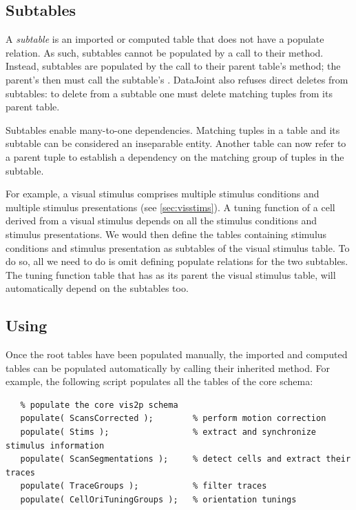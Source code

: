 \documentclass[10pt]{article}
\begin{document}
\subsection{Subtables}\label{sec:subtables}
A {\em subtable} is an imported or computed table that does not have a populate relation. As such, subtables cannot be populated by a call to their  method. Instead, subtables are populated by the call to their parent table's  method; the parent's  then must call the subtable's . DataJoint also refuses direct deletes from subtables: to delete from a subtable one must delete matching tuples from its parent table.

Subtables enable many-to-one dependencies. Matching tuples in a table and its subtable can be considered an inseparable entity. Another table can now refer to a parent tuple to establish a dependency on the matching group of tuples in the subtable.

For example, a visual stimulus comprises multiple stimulus conditions and multiple stimulus presentations (see \autoref{sec:visstims}). A tuning function of a cell derived from a visual stimulus depends on all the stimulus conditions and stimulus presentations.  We would then define the tables containing stimulus conditions and stimulus presentation as subtables of the visual stimulus table. To do so, all we need to do is omit defining populate relations for the two subtables.  The tuning function table that has as its parent the visual stimulus table, will automatically depend on the subtables too. 

\subsection{Using }
Once the root tables have been populated manually, the imported and computed tables can be populated automatically by calling their inherited  method.  For example, the following script populates all the tables of the core  schema:
\begin{lstlisting}
   % populate the core vis2p schema 
   populate( ScansCorrected );        % perform motion correction
   populate( Stims );                 % extract and synchronize stimulus information
   populate( ScanSegmentations );     % detect cells and extract their traces
   populate( TraceGroups );           % filter traces 
   populate( CellOriTuningGroups );   % orientation tunings
\end{lstlisting}
\end{document}
